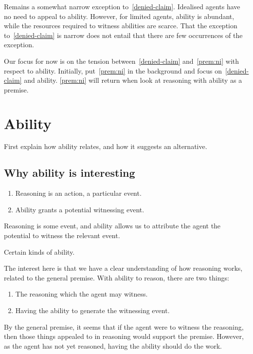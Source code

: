 \documentclass[10pt]{article}
\begin{document}
Remains a somewhat narrow exception to~\ref{denied-claim}.
Idealised agents have no need to appeal to ability.
However, for limited agents, ability is abundant, while the resources required to witness abilities are scarce.
That the exception to~\ref{denied-claim} is narrow does not entail that there are few occurrences of the exception.

Our focus for now is on the tension between~\ref{denied-claim} and~\ref{prem:ni} with respect to ability.
Initially, put~\ref{prem:ni} in the background and focus on~\ref{denied-claim} and ability.
\ref{prem:ni} will return when look at reasoning with ability as a premise.


\section{Ability}
\label{sec:ability}

First explain how ability relates, and how it suggests an alternative.

\subsection{Why ability is interesting}
\label{sec:why-abil-inter}

\begin{enumerate}
\item Reasoning is an action, a particular event.
\item Ability grants a potential witnessing event.
\end{enumerate}

Reasoning is some event, and ability allows us to attribute the agent the potential to witness the relevant event.

Certain kinds of ability.

The interest here is that we have a clear understanding of how reasoning works, related to the general premise.
With ability to reason, there are two things:
\begin{enumerate}
\item The reasoning which the agent may witness.
\item Having the ability to generate the witnessing event.
\end{enumerate}

By the general premise, it seems that if the agent were to witness the reasoning, then those things appealed to in reasoning would support the premise.
However, as the agent has not yet reasoned, having the ability should do the work.
\end{document}
